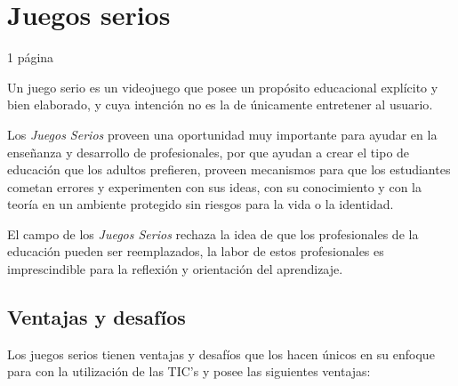 \section{Juegos serios}
1 página

Un juego serio es un videojuego que posee un propósito educacional explícito y
bien elaborado, y cuya intención no es la de únicamente entretener al
usuario\cite{abt1987serious,sg:aoverview,damien:sg}.

Los \emph{Juegos Serios} proveen una oportunidad muy importante para ayudar en
la enseñanza y desarrollo de profesionales\cite{mariluz:seiousgames}, por que
ayudan a crear el tipo de educación que los adultos prefieren, proveen
mecanismos para que los estudiantes cometan errores y experimenten con sus
ideas, con su conocimiento y con la teoría en un ambiente protegido sin riesgos
para la vida o la identidad\cite{sg:aoverview}. 

El campo de los \emph{Juegos Serios} rechaza la idea de que los profesionales de
la educación pueden ser reemplazados, la labor de estos profesionales es
imprescindible para la reflexión y orientación del
aprendizaje\cite{elearning:seiousgames}.

\subsection{Ventajas y desafíos}

Los juegos serios tienen ventajas y desafíos que los hacen únicos en su enfoque
para con la utilización de las TIC's y posee las siguientes ventajas:


